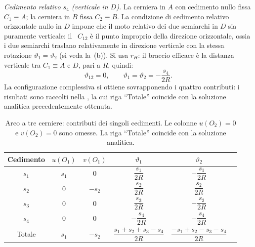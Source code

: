\begin{esempio}
\begin{svolgimento}
		\noindent\textit{Cedimento relativo $s_4$
			(verticale in $D$).}
		La cerniera in $A$ con cedimento nullo fissa
		$C_1 \equiv A$; la cerniera in $B$ fissa $C_2 \equiv B$.
		La condizione di cedimento relativo orizzontale nullo
		in $D$ impone che il moto relativo dei due semiarchi
		in $D$ sia puramente verticale: il \CRr\ $C_{12}$ è
		il punto improprio della direzione orizzontale, ossia
		i due semiarchi traslano relativamente in direzione
		verticale con la stessa rotazione
		$\vartheta_1 = \vartheta_2$ (si veda la \,(b)). Si usa $r_H$: il braccio
		efficace è la distanza verticale tra $C_1 \equiv A$ e
		$D$, pari a $R$, quindi:
		\begin{equation*}
			\vartheta_{12} = 0, \qquad
			\vartheta_1 = \vartheta_2 = -\frac{s_4}{2R}.
		\end{equation*}
		La configurazione complessiva si ottiene sovrapponendo
		i quattro contributi: i risultati sono raccolti nella
		, la cui riga
		``Totale'' coincide con la soluzione analitica	precedentemente ottenuta.
		
		
		
		\begin{table}[H]
			\small 
			\centering
			\renewcommand{\arraystretch}{1.8}
			\begin{tabular}{cccccc}
				\toprule
				Cedimento & $u(O_1)$ & $v(O_1)$ &
				$\vartheta_1$ & $\vartheta_2$ \\
				\midrule
				$s_1$ & $s_1$ & $0$ &
				$\dfrac{s_1}{2R}$ & $-\dfrac{s_1}{2R}$ \\[6pt]
				$s_2$ & $0$ & $-s_2$ &
				$\dfrac{s_2}{2R}$ & $\dfrac{s_2}{2R}$ \\[6pt]
				$s_3$ & $0$ & $0$ &
				$\dfrac{s_3}{2R}$ & $-\dfrac{s_3}{2R}$ \\[6pt]
				$s_4$ & $0$ & $0$ &
				$-\dfrac{s_4}{2R}$ & $-\dfrac{s_4}{2R}$ \\[6pt]
				\midrule
				Totale & $s_1$ & $-s_2$ &
				$\dfrac{s_1+s_2+s_3-s_4}{2R}$ &
				$\dfrac{-s_1+s_2-s_3-s_4}{2R}$ \\
				\bottomrule
			\end{tabular}
			\caption{Arco a tre cerniere: contributi dei singoli
				cedimenti. Le colonne $u(O_2)=0$ e $v(O_2)=0$
				sono omesse. La riga ``Totale'' coincide con la
				soluzione analitica.}
			\label{tab:arco_cedimenti}
		\end{table}
		
	\end{svolgimento}
\end{esempio}


